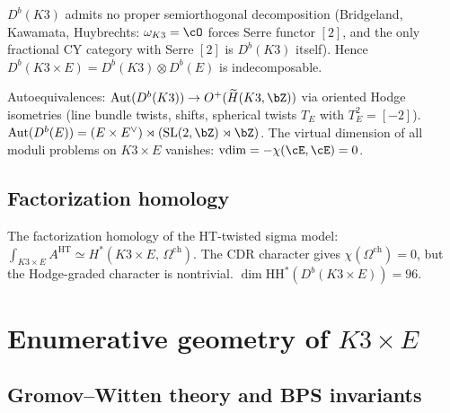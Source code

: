 \begin{proposition}
\label{prop:sod-k3xe}
$D^b(K3)$ admits no proper semiorthogonal decomposition
\textup{(}Bridgeland, Kawamata, Huybrechts: $\omega_{K3} = \cO$
forces Serre functor $[2]$, and the only fractional CY category
with Serre $[2]$ is $D^b(K3)$ itself\textup{)}. Hence
$D^b(K3 \times E) = D^b(K3) \otimes D^b(E)$ is indecomposable.

Autoequivalences: $\mathrm{Aut}(D^b(K3)) \to
O^+(\widetilde{H}(K3,\bZ))$ via oriented Hodge isometries
(line bundle twists, shifts, spherical twists $T_E$ with
$T_E^2 = [-2]$). $\mathrm{Aut}(D^b(E)) =
(E \times E^\vee) \rtimes (\mathrm{SL}(2,\bZ) \rtimes \bZ)$.
The virtual dimension of all moduli problems on $K3 \times E$
vanishes: $\mathrm{vdim} = -\chi(\cE,\cE) = 0$.
\end{proposition}

\subsection{Factorization homology}
\label{subsec:fact-homology-k3xe}

\begin{remark}
\label{rem:fact-homology-k3xe}
The factorization homology of the HT-twisted sigma model:
$\int_{K3 \times E} A^{\mathrm{HT}} \simeq
H^*(K3 \times E,\, \Omega^{\mathrm{ch}})$.
The CDR character gives $\chi(\Omega^{\mathrm{ch}}) = 0$, but the
Hodge-graded character is nontrivial.
$\dim \mathrm{HH}^*(D^b(K3 \times E)) = 96$.
\end{remark}



\section{Enumerative geometry of \texorpdfstring{$K3 \times E$}{K3 x E}}
\label{sec:enum-geom-k3xe}

\subsection{Gromov--Witten theory and BPS invariants}
\label{subsec:gw-bps}

